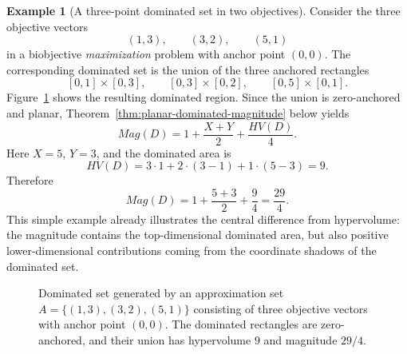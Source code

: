 \documentclass{article}
\def\HV{HV}%
\def\Mag{Mag}%
\theoremstyle{definition}
\newtheorem{example}[theorem]{Example}
\newcommand{\Mag}{\operatorname{Mag}}
\newcommand{\HV}{\operatorname{HV}}
\newcommand{\1}{\mathbf{1}}
\begin{document}
\begin{example}[A three-point dominated set in two objectives]\label{ex:intro-three-point-mag}
Consider the three objective vectors
\[
(1,3),\qquad (3,2),\qquad (5,1)
\]
in a biobjective \emph{maximization} problem with anchor point $(0,0)$. The corresponding dominated set is the union of the three anchored rectangles
\[
[0,1]\times[0,3],\qquad [0,3]\times[0,2],\qquad [0,5]\times[0,1].
\]
Figure~\ref{fig:intro-three-point-mag} shows the resulting dominated region. Since the union is zero-anchored and planar, Theorem~\ref{thm:planar-dominated-magnitude} below yields
\[
\Mag(D)=1+\frac{X+Y}{2}+\frac{\HV(D)}{4}.
\]
Here $X=5$, $Y=3$, and the dominated area is
\[
\HV(D)=3\cdot 1+2\cdot(3-1)+1\cdot(5-3)=9.
\]
Therefore
\[
\Mag(D)=1+\frac{5+3}{2}+\frac{9}{4}=\frac{29}{4}.
\]
This simple example already illustrates the central difference from hypervolume: the magnitude contains the top-dimensional dominated area, but also positive lower-dimensional contributions coming from the coordinate shadows of the dominated set.

\begin{figure}[t]
\centering
{}
\caption{Dominated set generated by an approximation set $A=\{(1,3), (3,2), (5,1)\}$ consisting of three objective vectors  with anchor point $(0,0)$. The dominated rectangles are zero-anchored, and their union has hypervolume $9$ and magnitude $29/4$.}
\label{fig:intro-three-point-mag}
\end{figure}
\end{example}
\end{document}
